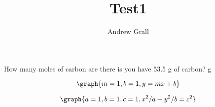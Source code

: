 \documentclass{ximera}
\title{Test1}
\author{Andrew Grall}
\begin{document}
\maketitle

\begin{problem}
   How many moles of carbon are there is you have 53.5 g of carbon?  g
\end{problem}

\[
\graph{m=1,b=1,y=mx+b}
\]

\[
\graph{a=1,b=1,c=1,x^2/a+y^2/b=c^2}
\]
\end{document}

